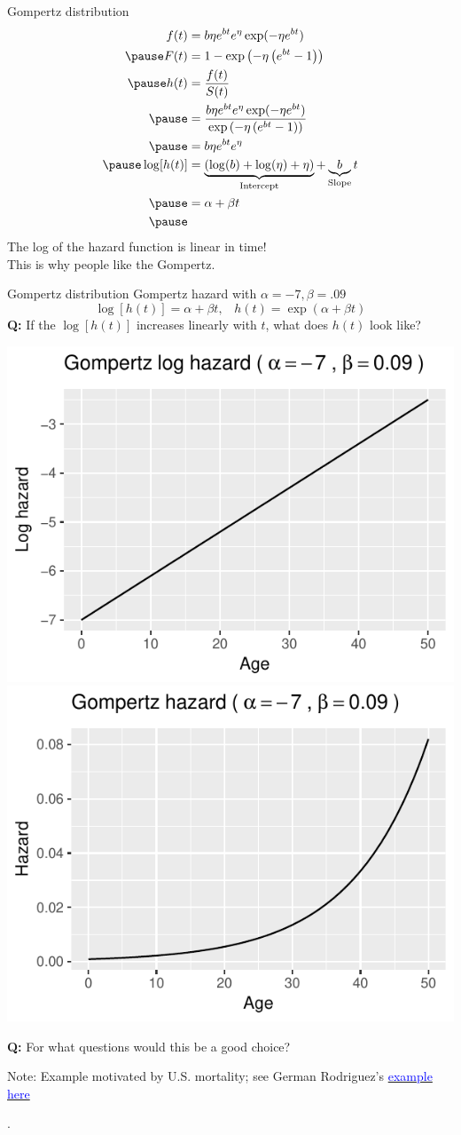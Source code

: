 \documentclass{beamer}
\newcommand\blue[1]{{\color{blue}#1}}
\newcommand\bblue[1]{{\color{blue}\textbf{#1}}}
\newcommand\green[1]{{\color{olive}#1}}
\begin{document}
\begin{frame}{Gompertz distribution}
$$\begin{aligned}
f(t) &= b\eta e^{bt}e^\eta \exp(-\eta e^{bt}) \\ \pause
F(t) &= 1-\exp \left(-\eta \left(e^{{bt}}-1\right)\right) \\ \pause
h(t) &= \frac{f(t)}{S(t)} \\ \pause
&= \frac{b\eta e^{bt}e^\eta \exp(-\eta e^{bt})}{\exp \left(-\eta \left(e^{{bt}}-1\right)\right)} \\ \pause
&= b\eta e^{bt}e^\eta \\ \pause
\log[h(t)] &= \underbrace{(\log(b) + \log(\eta) + \eta)}_{\text{Intercept}} + \underbrace{b}_{\text{Slope}}t \\ \pause
&= \alpha + \beta t \\ \pause
\end{aligned}$$ 
The \blue{log of the hazard function} is \green{linear in time!} \\
This is why people like the Gompertz.
\end{frame}

\begin{frame}{Gompertz distribution}
Gompertz hazard with $\alpha = -7, \beta = .09$
$$\log[h(t)] = \alpha + \beta t, \hspace{10pt} h(t) = \exp(\alpha + \beta t)$$ \pause
\bblue{Q:} If the $\log[h(t)]$ increases linearly with $t$, what does $h(t)$ look like?
\begin{center} \includegraphics[width = .4\textwidth]{figs/GompertzLogHazard.pdf}\pause\includegraphics[width = .4\textwidth]{figs/GompertzHazard.pdf} \end{center} \pause
\bblue{Q:} For what questions would this be a good choice? \pause \green{Mortality} \\
\begin{footnotesize}Note: Example motivated by U.S. mortality; see German Rodriguez's \href{http://data.princeton.edu/eco572/us2002gompertz.html}{\textcolor{blue}{example here}}\end{footnotesize}.
\end{frame}
\end{document}
